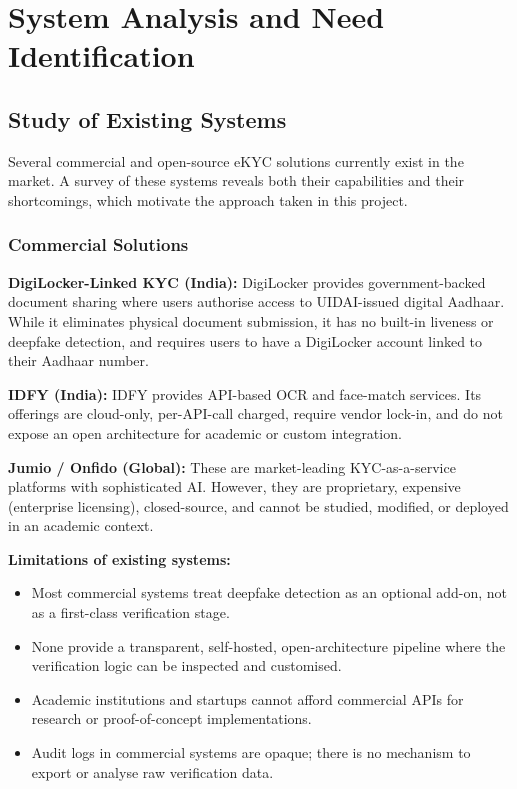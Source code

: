 \documentclass[12pt,a4paper]{report}
\begin{document}
\chapter{System Analysis and Need Identification}

\section{Study of Existing Systems}

Several commercial and open-source eKYC solutions currently exist in the market. A survey of these systems reveals both their capabilities and their shortcomings, which motivate the approach taken in this project.

\subsection{Commercial Solutions}

\textbf{DigiLocker-Linked KYC (India):} DigiLocker provides government-backed document sharing where users authorise access to UIDAI-issued digital Aadhaar. While it eliminates physical document submission, it has no built-in liveness or deepfake detection, and requires users to have a DigiLocker account linked to their Aadhaar number.

\textbf{IDFY (India):} IDFY provides API-based OCR and face-match services. Its offerings are cloud-only, per-API-call charged, require vendor lock-in, and do not expose an open architecture for academic or custom integration.

\textbf{Jumio / Onfido (Global):} These are market-leading KYC-as-a-service platforms with sophisticated AI. However, they are proprietary, expensive (enterprise licensing), closed-source, and cannot be studied, modified, or deployed in an academic context.

\textbf{Limitations of existing systems:}
\begin{itemize}
    \item Most commercial systems treat deepfake detection as an optional add-on, not as a first-class verification stage.
    \item None provide a transparent, self-hosted, open-architecture pipeline where the verification logic can be inspected and customised.
    \item Academic institutions and startups cannot afford commercial APIs for research or proof-of-concept implementations.
    \item Audit logs in commercial systems are opaque; there is no mechanism to export or analyse raw verification data.
\end{itemize}
\end{document}
